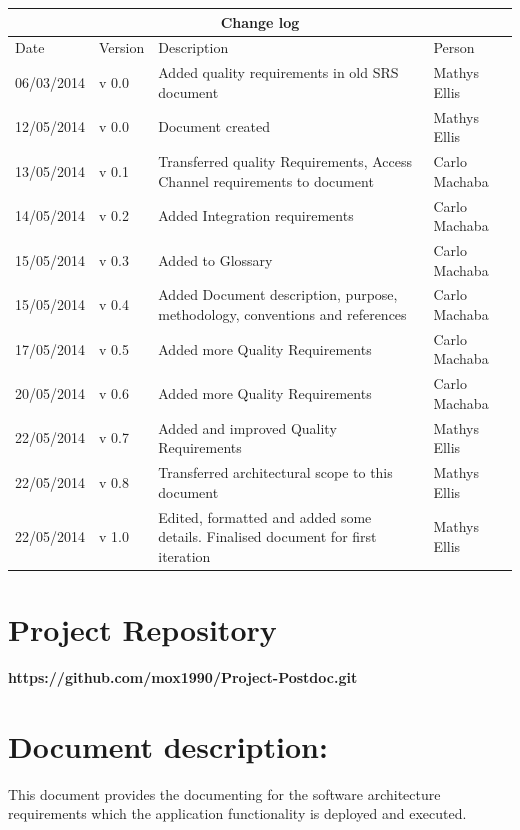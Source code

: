 \documentclass[12pt]{article}
\newcommand{\repo}{https://github.com/mox1990/Project-Postdoc.git}
\begin{document}
\begin{center}
\begin{tabular}{|l|p{1.4cm}|p{8cm}|p{2.8cm}|}
\hline
\multicolumn{4}{|c|}{\bf Change log} \\
\hline
 Date & Version & Description &  Person \\
\hline
06/03/2014 & v 0.0 & Added quality requirements in old SRS document & Mathys Ellis \\
\hline
12/05/2014 & v 0.0 & Document created & Mathys Ellis \\
\hline
13/05/2014 & v 0.1 & Transferred quality Requirements, Access Channel requirements to document & Carlo Machaba \\
\hline
14/05/2014 & v 0.2 & Added Integration requirements & Carlo Machaba\\
\hline
15/05/2014 & v 0.3 & Added to Glossary & Carlo Machaba \\
\hline
15/05/2014 & v 0.4 & Added Document description, purpose, methodology, conventions and references & Carlo Machaba \\
\hline
17/05/2014 & v 0.5 & Added more Quality Requirements & Carlo Machaba \\
\hline
20/05/2014 & v 0.6 & Added more Quality Requirements & Carlo Machaba \\
\hline
22/05/2014 & v 0.7 & Added and improved Quality Requirements & Mathys Ellis \\
\hline
22/05/2014 & v 0.8 & Transferred architectural scope to this document & Mathys Ellis \\
\hline
22/05/2014 & v 1.0 & Edited, formatted and added some details. Finalised document for first iteration & Mathys Ellis \\
\hline
\end{tabular}
\end{center}
\newpage
\tableofcontents

\listoffigures
\newpage
\section{Project Repository}
\textbf{\repo}
\newpage
\section{Document description:}
This document provides the documenting for the software architecture requirements which the application functionality is deployed and executed.
\end{document}
